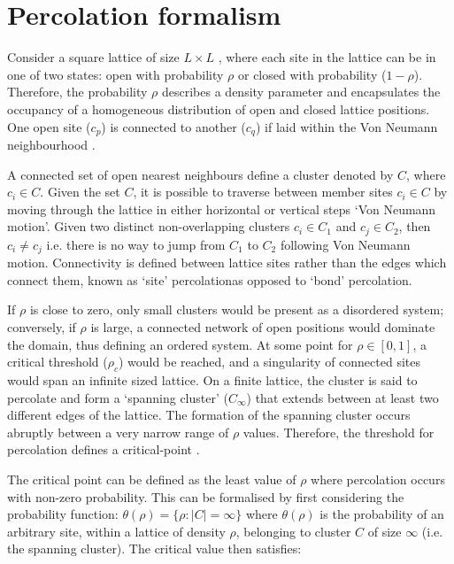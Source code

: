 \section{Percolation formalism}
Consider a square lattice of size $L \times L$ , where each site in the lattice can be in one of two states: %
open with probability $\rho$ or closed with probability ($1-\rho$). %
Therefore, the probability $\rho$ describes a density parameter and encapsulates the occupancy of a homogeneous distribution of open and closed lattice positions.
One open site ($c_p$) is connected to another ($c_q$) if laid within the Von Neumann neighbourhood \cite{toffoli1987cellular}.

A connected set of open nearest neighbours define a cluster denoted by $C$, where $c_i \in C$.
Given the set $C$, it is possible to traverse between member sites $c_i \in C$ by moving through the lattice in either horizontal or vertical steps `Von Neumann motion'. 
Given two distinct non-overlapping clusters $c_i \in C_1$ and $c_j \in C_2$, then $c_i \neq c_j $ i.e. there is no way to jump from $C_1$ to $C_2$ following Von Neumann motion. 
Connectivity is defined between lattice sites rather than the edges which connect them, known as `site' percolation\textemdash as opposed to `bond' percolation.

If $\rho$ is close to zero, only small clusters would be present as a disordered system; 
conversely, if $\rho$ is large, a connected network of open positions would dominate the domain, thus defining an ordered system.
At some point for $\rho \in [0, 1]$, a critical threshold ($\rho_c$) would be reached, and a singularity of connected sites would span an infinite sized lattice.
On a finite lattice, the cluster is said to percolate and form a `spanning cluster' ($C_\infty$) that extends between at least two different edges of the lattice.
The formation of the spanning cluster occurs abruptly between a very narrow range of $\rho$ values. 
Therefore, the threshold for percolation defines a critical-point \cite{STAUFFER19791}. 

The critical point can be defined as the least value of $\rho$ where percolation occurs with non-zero probability. %
This can be formalised by first considering the probability function: $\theta (\rho)= \lbrace \rho:|C|=\infty\rbrace$ where $\theta(\rho)$ is the probability of an arbitrary site, %
within a lattice of density $\rho$, belonging to cluster $C$ of size $\infty$ (i.e. the spanning cluster). %
The critical value then satisfies: %

